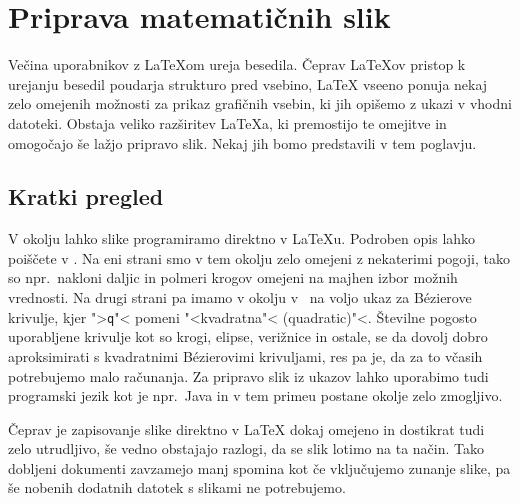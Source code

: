 \setcounter{chapter}{4}
\newcommand{\graphicscompanion}{\emph{The \LaTeX{} Graphics Companion}~\cite{graphicscompanion}} 
\newcommand{\hobby}{\emph{A User's Manual for MetaPost}~\cite{metapost}}
\newcommand{\hoenig}{\emph{\TeX{} Unbound}~\cite{unbound}}
\newcommand{\graphicsinlatex}{\emph{Graphics in \LaTeXe{}}~\cite{ursoswald}}

\chapter{Priprava matematičnih slik}
\label{chap:graphics}

\begin{intro}
Večina uporabnikov z \LaTeX{}om ureja besedila. Čeprav \LaTeX{}ov pristop
k urejanju besedil poudarja strukturo pred vsebino, \LaTeX{} vseeno 
ponuja nekaj zelo omejenih možnosti za prikaz grafičnih 
vsebin, ki jih opišemo z ukazi v vhodni datoteki. Obstaja veliko
razširitev \LaTeX{}a, ki premostijo te omejitve in omogočajo še
lažjo pripravo slik. Nekaj jih bomo predstavili v tem poglavju.
\end{intro}

\section{Kratki pregled}

V okolju  lahko slike programiramo direktno v \LaTeX{}u. Podroben
opis lahko poiščete v  \manual. Na eni strani smo v tem okolju 
zelo omejeni z nekaterimi pogoji, tako so npr.~nakloni daljic in 
polmeri krogov omejeni na majhen izbor možnih vrednosti.  
Na drugi strani pa imamo v okolju  v \LaTeXe\ na voljo ukaz
 za B\'ezierove krivulje, kjer ">\texttt{q}"< pomeni 
"<kvadratna"< (quadratic)"<.  Številne pogosto uporabljene
krivulje kot so krogi, elipse, verižnice in ostale, se da dovolj 
dobro aproksimirati s kvadratnimi B\'ezierovimi krivuljami, res pa je, da
za to včasih potrebujemo malo računanja. Za pripravo
slik iz ukazov  lahko uporabimo tudi programski jezik kot je 
npr.~Java in v tem primeu postane okolje  zelo zmogljivo.

Čeprav je zapisovanje slike direktno v \LaTeX{} dokaj omejeno in dostikrat
tudi zelo utrudljivo, še vedno obstajajo razlogi, da se slik 
lotimo na ta način. Tako dobljeni dokumenti zavzamejo manj spomina kot če
vključujemo zunanje slike, pa še nobenih dodatnih datotek s slikami ne
potrebujemo.

